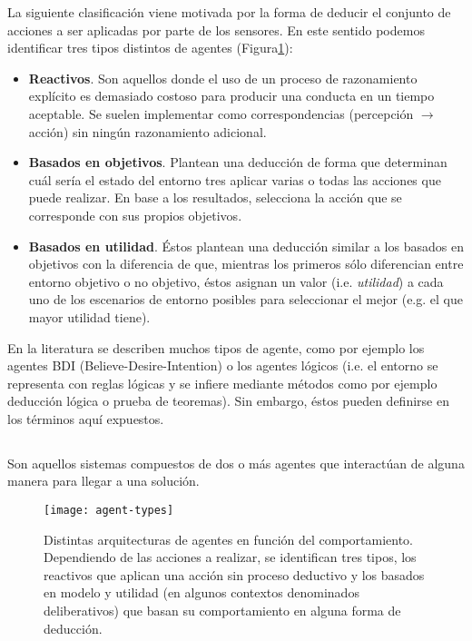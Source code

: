 La siguiente clasificación viene motivada por la forma de deducir el conjunto de acciones a ser aplicadas por parte de los sensores. En este sentido podemos identificar tres tipos distintos de agentes (Figura\ref{fig:agent-types}):

\begin{itemize}
	\item \textbf{Reactivos}. Son aquellos donde el uso de un proceso de razonamiento explícito es demasiado costoso para producir una conducta en un tiempo aceptable. Se suelen implementar como correspondencias (percepción $\rightarrow$ acción) sin ningún razonamiento adicional.
	\item \textbf{Basados en objetivos}. Plantean una deducción de forma que determinan cuál sería el estado del entorno tres aplicar varias o todas las acciones que puede realizar. En base a los resultados, selecciona la acción que se corresponde con sus propios objetivos.
	\item \textbf{Basados en utilidad}. Éstos plantean una deducción similar a los basados en objetivos con la diferencia de que, mientras los primeros sólo diferencian entre entorno objetivo o no objetivo, éstos asignan un valor (i.e. \textit{utilidad}) a cada uno de los escenarios de entorno posibles para seleccionar el mejor (e.g. el que mayor utilidad tiene).
\end{itemize}

En la literatura se describen muchos tipos de agente, como por ejemplo los agentes BDI (Believe-Desire-Intention) o los agentes lógicos (i.e. el entorno se representa con reglas lógicas y se infiere mediante métodos como por ejemplo deducción lógica o prueba de teoremas). Sin embargo, éstos pueden definirse en los términos aquí expuestos. 

\subsection{}

Son aquellos sistemas compuestos de dos o más agentes que interactúan de alguna manera para llegar a una solución.

\begin{figure}[t]
	\texttt{[image: agent-types]}
	\caption[Arquitecturas de agente según su comportamiento]{Distintas arquitecturas de agentes en función del comportamiento. Dependiendo de las acciones a realizar, se identifican tres tipos, los reactivos que aplican una acción sin proceso deductivo y los basados en modelo y utilidad (en algunos contextos denominados deliberativos) que basan su comportamiento en alguna forma de deducción.}
	\label{fig:agent-types}
\end{figure}

